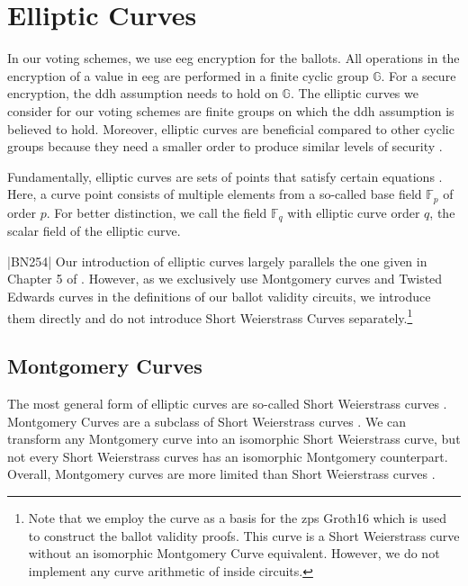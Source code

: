 \chapter{Elliptic Curves}
\label{chap:ellipticCurves}

In our voting schemes, we use \gls{eeg} encryption for the ballots.
All operations in the encryption of a value in \gls{eeg} are performed in a finite cyclic group $\mathbb{G}$.
For a secure encryption, the \gls{ddh} assumption needs to hold on $\mathbb{G}$.
The elliptic curves we consider for our voting schemes are finite groups on which the \gls{ddh} assumption is believed to hold.
Moreover, elliptic curves are beneficial compared to other cyclic groups because they need a smaller order to produce similar levels of security \cite{national_security_agency_case_2009}.

Fundamentally, elliptic curves are sets of points that satisfy certain equations \cite{least_authority_moonmath_2024}. 
Here, a curve point consists of multiple elements from a so-called base field $\mathbb{F}_p$ of order $p$.
For better distinction, we call the field $\mathbb{F}_q$ with elliptic curve order $q$, the scalar field of the elliptic curve.

|BN254|
Our introduction of elliptic curves largely parallels the one given in Chapter 5 of \cite{least_authority_moonmath_2024}.
However, as we exclusively use Montgomery curves and Twisted Edwards curves in the definitions of our ballot validity circuits, we introduce them directly and do not introduce Short Weierstrass Curves separately.\footnote{
    \label{footnote:shortWeierstrassForGroth16}
    Note that we employ the curve  as a basis for the \gls{zps} Groth16 which is used to construct the ballot validity proofs.
    This curve is a Short Weierstrass curve without an isomorphic Montgomery Curve equivalent.
    However, we do not implement any curve arithmetic of  inside circuits.
}

\section{Montgomery Curves}
\label{section:ellipticCurves:montgomery}

The most general form of elliptic curves are so-called Short Weierstrass curves \cite{least_authority_moonmath_2024}.
Montgomery Curves are a subclass of Short Weierstrass curves \cite{montgomery_speeding_1987}.
We can transform any Montgomery curve into an isomorphic Short Weierstrass curve, but not every Short Weierstrass curves has an isomorphic Montgomery counterpart.
Overall, Montgomery curves are more limited than Short Weierstrass curves \cite{least_authority_moonmath_2024}.

